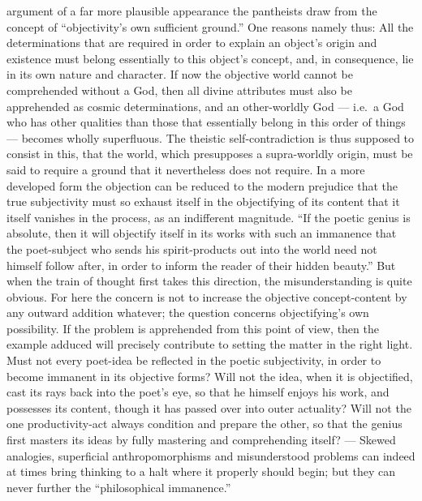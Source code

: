 \documentclass[12pt]{book}
\begin{document}
argument of a far more plausible appearance the pantheists draw from the
concept of ``objectivity's own sufficient ground.'' One reasons namely thus:
All the determinations that are required in order to explain an object's
origin and existence must belong essentially to this object's concept, and,
in consequence, lie in its own nature and character. If now the objective
world cannot be comprehended without a God, then all divine attributes must
also be apprehended as cosmic determinations, and an other-worldly God ---
i.e.\ a God who has other qualities than those that essentially belong in
this order of things --- becomes wholly superfluous. The theistic
self-contradiction is thus supposed to consist in this, that the world,
which presupposes a supra-worldly origin, must be said to require a ground
that it nevertheless does not require. In a more developed form the
objection can be reduced to the modern prejudice that the true subjectivity
must so exhaust itself in the objectifying of its content that it itself
vanishes in the process, as an indifferent magnitude. ``If the poetic
genius is absolute, then it will objectify itself in its works with such an
immanence that the poet-subject who sends his spirit-products out into the
world need not himself follow after, in order to inform the reader of their
hidden beauty.'' But when the train of thought first takes this direction,
the misunderstanding is quite obvious. For here the concern is not to
increase the objective concept-content by any outward addition whatever; the
question concerns objectifying's own possibility. If the problem is
apprehended from this point of view, then the example adduced will precisely
contribute to setting the matter in the right light. Must not every
poet-idea be reflected in the poetic subjectivity, in order to become
immanent in its objective forms? Will not the idea, when it is objectified,
cast its rays back into the poet's eye, so that he himself enjoys his work,
and possesses its content, though it has passed over into outer actuality?
Will not the one productivity-act always condition and prepare the other, so
that the genius first masters its ideas by fully mastering and comprehending
itself? --- Skewed analogies, superficial anthropomorphisms and
misunderstood problems can indeed at times bring thinking to a halt where it
properly should begin; but they can never further the ``philosophical
immanence.''
\end{document}
